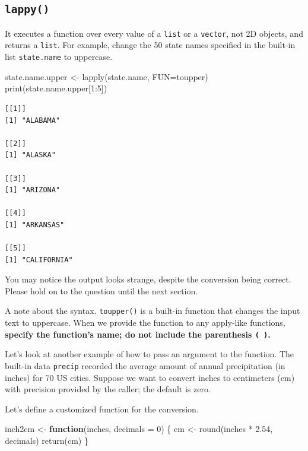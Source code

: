 \documentclass[
  letterpaper,
  DIV=11,
  numbers=noendperiod]{scrreprt}
\newenvironment{Shaded}{\begin{snugshade}}{\end{snugshade}}
\newcommand{\AttributeTok}[1]{\textcolor[rgb]{0.40,0.45,0.13}{#1}}
\newcommand{\ControlFlowTok}[1]{\textcolor[rgb]{0.00,0.23,0.31}{\textbf{#1}}}
\newcommand{\DecValTok}[1]{\textcolor[rgb]{0.68,0.00,0.00}{#1}}
\newcommand{\FloatTok}[1]{\textcolor[rgb]{0.68,0.00,0.00}{#1}}
\newcommand{\FunctionTok}[1]{\textcolor[rgb]{0.28,0.35,0.67}{#1}}
\newcommand{\NormalTok}[1]{\textcolor[rgb]{0.00,0.23,0.31}{#1}}
\newcommand{\OtherTok}[1]{\textcolor[rgb]{0.00,0.23,0.31}{#1}}
\newcommand{\SpecialCharTok}[1]{\textcolor[rgb]{0.37,0.37,0.37}{#1}}
\begin{document}
\subsection{\texorpdfstring{\texttt{lappy()}}{lappy()}}\label{lappy}

It executes a function over every value of a \texttt{list} or a
\texttt{vector}, not 2D objects, and returns a \texttt{list}. For
example, change the 50 state names specified in the built-in list
\texttt{state.name} to uppercase.

\begin{Shaded}
\begin{Highlighting}[]
\NormalTok{state.name.upper }\OtherTok{\textless{}{-}} \FunctionTok{lapply}\NormalTok{(state.name, }\AttributeTok{FUN=}\NormalTok{toupper)}
\FunctionTok{print}\NormalTok{(state.name.upper[}\DecValTok{1}\SpecialCharTok{:}\DecValTok{5}\NormalTok{])}
\end{Highlighting}
\end{Shaded}

\begin{verbatim}
[[1]]
[1] "ALABAMA"

[[2]]
[1] "ALASKA"

[[3]]
[1] "ARIZONA"

[[4]]
[1] "ARKANSAS"

[[5]]
[1] "CALIFORNIA"
\end{verbatim}

You may notice the output looks strange, despite the conversion being
correct. Please hold on to the question until the next section.

A note about the syntax. \texttt{toupper()} is a built-in function that
changes the input text to uppercase. When we provide the function to any
apply-like functions, \textbf{specify the function's name; do not
include the parenthesis \texttt{(\ )}.}

Let's look at another example of how to pass an argument to the
function. The built-in data \texttt{precip} recorded the average amount
of annual precipitation (in inches) for 70 US cities. Suppose we want to
convert inches to centimeters (cm) with precision provided by the
caller; the default is zero.

Let's define a customized function for the conversion.

\begin{Shaded}
\begin{Highlighting}[]
\NormalTok{inch2cm }\OtherTok{\textless{}{-}} \ControlFlowTok{function}\NormalTok{(inches, }\AttributeTok{decimals =} \DecValTok{0}\NormalTok{) \{}
\NormalTok{  cm }\OtherTok{\textless{}{-}} \FunctionTok{round}\NormalTok{(inches }\SpecialCharTok{*} \FloatTok{2.54}\NormalTok{, decimals)}
  \FunctionTok{return}\NormalTok{(cm)}
\NormalTok{\}}
\end{Highlighting}
\end{Shaded}
\end{document}
